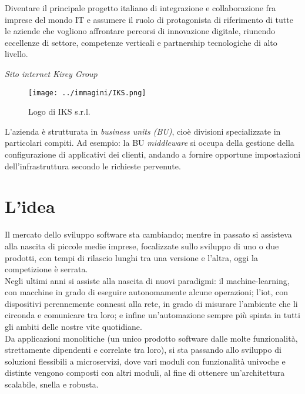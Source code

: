 \begin{shadequote}
    Diventare il principale progetto italiano di integrazione e collaborazione fra imprese del mondo IT e assumere il ruolo di protagonista di riferimento di tutte le aziende che vogliono affrontare percorsi di innovazione digitale, riunendo eccellenze di settore, competenze verticali e partnership tecnologiche di alto livello.\par\emph{Sito internet Kirey Group}
\end{shadequote}


\vspace{2.5em}
\begin{figure}[H]
    \capstart
    \centering
    \texttt{[image: ../immagini/IKS.png]}
    \caption{Logo di IKS s.r.l.}
\end{figure}

L'azienda è strutturata in \textit{business units (BU)}, cioè divisioni specializzate in particolari compiti. Ad esempio: la BU \textit{\gls{middleware}} si occupa della gestione della configurazione di applicativi dei clienti, andando a fornire opportune impostazioni dell'infrastruttura secondo le richieste pervenute.

\section{L'idea}
\label{sec:idea}
Il mercato dello sviluppo software sta cambiando; mentre in passato si assisteva alla nascita di piccole medie imprese, focalizzate sullo sviluppo di uno o due prodotti, con tempi di rilascio lunghi tra una versione e l'altra, oggi la competizione è serrata. \\ Negli ultimi anni si assiste alla nascita di nuovi paradigmi: il \gls{machine-learning}, con macchine in grado di eseguire autonomamente alcune operazioni; l'\gls{iot}, con dispositivi perennemente connessi alla rete, in grado di misurare l'ambiente che li circonda e comunicare tra loro; e infine un'automazione sempre più spinta in tutti gli ambiti delle nostre vite quotidiane.\\
Da applicazioni monolitiche (un unico prodotto software dalle molte funzionalità, strettamente dipendenti e correlate tra loro), si sta passando allo sviluppo di soluzioni flessibili a microservizi, dove vari moduli con funzionalità univoche e distinte vengono composti con altri moduli, al fine di ottenere un'architettura scalabile, snella e robusta.\\

